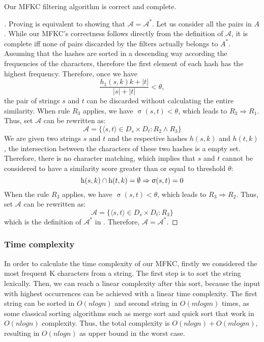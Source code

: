 \begin{theorem} \label{thr:cc}
Our MFKC filtering algorithm is correct and complete.
\end{theorem}

\begin{proof}[]
	Proving  is equivalent to showing that $\mathcal{A}=\mathcal{A}^*$. Let us consider all the pairs in $A$. While our MFKC's correctness follows directly from the definition of $\mathcal{A}$, it is complete iff none of pairs discarded by the filters actually belongs to $A^*$. Assuming that the hashes are sorted in a descending way according the frequencies of the characters, therefore the first element of each hash has the highest frequency. Therefore, once we have 
	\begin{equation*}
		\frac{h_1(s,k) k + |t|}{|s| + |t|} < \theta,
	\end{equation*}
	the pair of strings $s$ and $t$ can be discarded without calculating the entire similarity. When rule $R_3$ applies, we have $\upsigma(s,t) < \theta$, which leads to $R_3 \Rightarrow R_1$. Thus, set $\mathcal{A}$ can be rewritten as:
	\begin{equation}
		\mathcal{A}=\{\langle s,t \rangle \in D_s \times D_t : R_2 \wedge R_3 \} 
	\end{equation}	
	We are given two strings $s$ and $t$ and the respective hashes $h(s,k)$ and $h(t,k)$, the intersection between the characters of these two hashes is a empty set. Therefore, there is no character matching, which implies that $s$ and $t$ cannot be considered to have a similarity score greater than or equal to threshold $\theta$:
	\begin{equation*}
		\textnormal{h}(s,k) \cap \textnormal{h}(t,k) = \emptyset \Rightarrow \upsigma(s,t)=0
	\end{equation*}
	When the rule $R_3$ applies, we have $\upsigma(s,t) < \theta$, which leads to $R_3 \Rightarrow R_2$. Thus, set $\mathcal{A}$ can be rewritten as:
	\begin{equation}
		\mathcal{A}=\{\langle s,t \rangle \in D_s \times D_t : R_3 \} 
	\end{equation}
    which is the definition of $\mathcal{A}^*$ in . Therefore, $\mathcal{A}=\mathcal{A}^*$.
\end{proof}
%
\subsubsection{Time complexity}
In order to calculate the time complexity of our MFKC, firstly we considered the most frequent K characters from a string.
The first step is to sort the string lexically. 
Then, we can reach a linear complexity after this sort, because the input with highest occurrences can be achieved with a linear time complexity. 
The first string can be sorted in $O (n log n)$ and second string in $O(m log m)$ times, as some classical sorting algorithms such as merge sort \cite{goldstine1948planning} and quick sort \cite{hoare1962quicksort} that work in $O(n log n)$ complexity. 
Thus, the total complexity is $O(n log n) + O(m log m)$, resulting in $O(n log n)$ as upper bound in the worst case.

